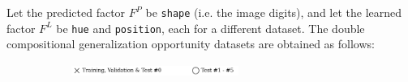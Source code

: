 \begin{dataset}
\begin{figure}[H]
\begin{subfigure}[b]{0.45\textwidth}
\begin{subfigure}[b]{0.48\textwidth}
            \end{subfigure}
        \end{subfigure}
    \end{figure}
\end{dataset}

\begin{dataset}\label{def:2_cgo_experiments}
    Let the predicted factor $F^P$ be \texttt{shape} (i.e. the image digits), and let the 
    learned factor $F^L$ be \texttt{hue} and \texttt{position}, each for a different dataset. The 
    double compositional generalization opportunity datasets are obtained as follows:

    \begin{figure}[H]
        \centering
        \begin{subfigure}[b]{\textwidth}
            \centering
            \includegraphics[width=0.6\textwidth]{img/datasets/_legend.pdf}
        \end{subfigure}
        \vspace{-0.2cm} %


\end{figure}
\end{dataset}
